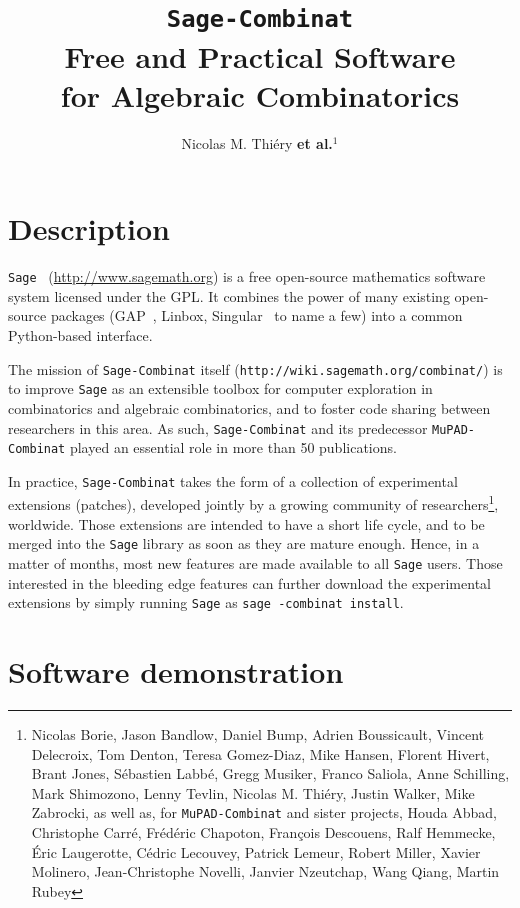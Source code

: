 \documentclass[proceedings,submission]{dmtcs}
\title[\texttt{Sage-Combinat},
  Free and Practical Software
  for Algebraic Combinatorics]{\texttt{Sage-Combinat}\\
  Free and Practical Software\\
  for Algebraic Combinatorics}
\author[{Nicolas M. Thiéry \textbf{et al.}}]{Nicolas M. Thiéry \textbf{et al.$^{1}$}}
\begin{document}
\maketitle

\section{Description}

\texttt{Sage}~\cite{Sage} (\url{http://www.sagemath.org}) is a free
open-source mathematics software system licensed under the GPL. It
combines the power of many existing open-source packages
(GAP~\cite{GAP4}, Linbox, Singular~\cite{Singular} to name a few) into
a common Python-based interface.

The mission of \texttt{Sage-Combinat} itself
(\texttt{http://wiki.sagemath.org/combinat/}) is to improve
\texttt{Sage} as an extensible toolbox for computer exploration in
combinatorics and algebraic combinatorics, and to foster code sharing
between researchers in this area.
%
As such, \texttt{Sage-Combinat} and its predecessor
\texttt{MuPAD-Combinat} played an essential role in more than 50
publications.

In practice, \texttt{Sage-Combinat} takes the form of a collection of
experimental extensions (patches), developed jointly by a growing
community of researchers\footnote{ Nicolas Borie, Jason Bandlow,
  Daniel Bump, Adrien Boussicault, Vincent Delecroix, Tom Denton,
  Teresa Gomez-Diaz, Mike Hansen, Florent Hivert, Brant Jones,
  Sébastien Labbé, Gregg Musiker, Franco Saliola, Anne Schilling, Mark
  Shimozono, Lenny Tevlin, Nicolas M. Thiéry, Justin Walker, Mike
  Zabrocki, as well as, for \texttt{MuPAD-Combinat} and sister
  projects, Houda Abbad, Christophe Carré, Frédéric Chapoton, François
  Descouens, Ralf Hemmecke, Éric Laugerotte, Cédric Lecouvey, Patrick
  Lemeur, Robert Miller, Xavier Molinero, Jean-Christophe Novelli,
  Janvier Nzeutchap, Wang Qiang, Martin Rubey }, worldwide. Those
extensions are intended to have a short life cycle, and to be merged
into the \texttt{Sage} library as soon as they are mature
enough. Hence, in a matter of months, most new features are made
available to all \texttt{Sage} users. Those interested in the bleeding
edge features can further download the experimental extensions by
simply running \texttt{Sage} as \texttt{sage -combinat install}.


\section{Software demonstration}
  
\end{document}
